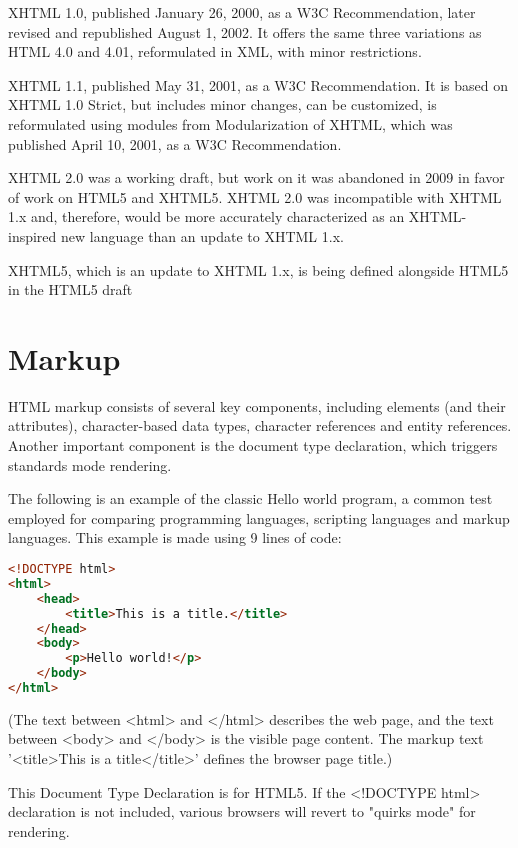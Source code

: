\begin{compactitem}
\item XHTML 1.0, published January 26, 2000, as a W3C Recommendation, later revised and republished August 1, 2002. It offers the same three variations as HTML 4.0 and 4.01, reformulated in XML, with minor restrictions.
\item XHTML 1.1, published May 31, 2001, as a W3C Recommendation. It is based on XHTML 1.0 Strict, but includes minor changes, can be customized, is reformulated using modules from Modularization of XHTML, which was published April 10, 2001, as a W3C Recommendation.
\item XHTML 2.0 was a working draft, but work on it was abandoned in 2009 in favor of work on HTML5 and XHTML5. XHTML 2.0 was incompatible with XHTML 1.x and, therefore, would be more accurately characterized as an XHTML-inspired new language than an update to XHTML 1.x.
\item XHTML5, which is an update to XHTML 1.x, is being defined alongside HTML5 in the HTML5 draft
\end{compactitem}

\chapter{Markup}

HTML markup consists of several key components, including elements (and their attributes), character-based data types, character references and entity references. Another important component is the document type declaration, which triggers standards mode rendering.

The following is an example of the classic Hello world program, a common test employed for comparing programming languages, scripting languages and markup languages. This example is made using 9 lines of code:

\begin{lstlisting}[language=HTML]
<!DOCTYPE html>
<html>
	<head>
		<title>This is a title.</title>
	</head>
	<body>
		<p>Hello world!</p>
	</body>
</html>
\end{lstlisting}

(The text between <html> and </html> describes the web page, and the text between <body> and </body> is the visible page content. The markup text '<title>This is a title</title>' defines the browser page title.)


This Document Type Declaration is for HTML5. If the <!DOCTYPE html> declaration is not included, various browsers will revert to "quirks mode" for rendering.

